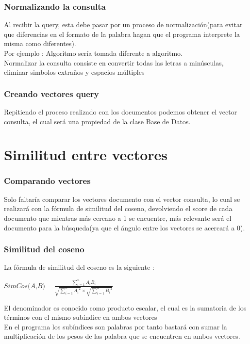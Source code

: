 \documentclass{beamer}
\begin{document}
\begin{frame}
    \frametitle{Normalizando la consulta}
    Al recibir la query, esta debe pasar por un proceso de normalización(para evitar que diferencias en el formato de la palabra
    hagan que el programa interprete la misma como diferentes). \\[20pt]
    
    Por ejemplo : Algoritmo sería tomada diferente a algoritmo.\\[20pt]

    Normalizar la consulta consiste en convertir todas las letras a minúsculas, eliminar simbolos extraños y espacios múltiples
    
\end{frame}

\begin{frame}
    \frametitle{Creando vectores query}
    Repitiendo el proceso realizado con los documentos podemos obtener el vector consulta, el cual será una propiedad de la clase
    Base de Datos.

\end{frame}
\section{Similitud entre vectores}

\begin{frame}
    \frametitle{Comparando vectores}
    Solo faltaría comparar los vectores documento con el vector consulta, lo cual se realizará con la fórmula de similitud
    del coseno, devolviendo el score de cada documento que mientras más cercano a 1 se encuentre, más relevante será el documento
    para la búsqueda(ya que el ángulo entre los vectores se acercará a 0).    
\end{frame}

\begin{frame}
    \frametitle{Similitud del coseno}
    La fórmula de similitud del coseno es la siguiente :
    
    \begin{center}
        $\textit{SimCos(A,B)} = \frac{\sum_{i = 1}^{n}A_iB_i}{\sqrt{\sum_{i = 1}^{n}{A_i}^2} \times \sqrt{\sum_{i = 1}^{n}{B_i}^2}   } $
    \end{center}

    El denominador es conocido como producto escalar, el cual es la sumatoria de los términos con el mismo subíndice en 
    ambos vectores \\[8pt]

    En el programa los subíndices son palabras por tanto bastará con sumar la multiplicación de los pesos de las palabra que se encuentren 
    en ambos vectores.
\end{frame}
\end{document}
